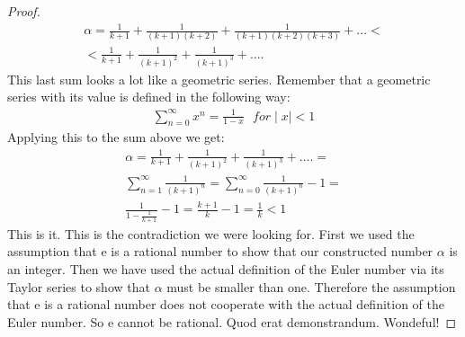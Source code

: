 \documentclass{article}
\theoremstyle{definition}
\begin{document}
\begin{proof}
\begin{align}
    \alpha = \frac{1}{k+1} + \frac{1}{(k+1)(k+2)} + \frac{1}{(k+1)(k+2)(k+3)}+... < \\
    < \frac{1}{k+1} + \frac{1}{(k+1)^2} + \frac{1}{(k+1)^3} + ....
\end{align}
This last sum looks a lot like a geometric series. Remember that a geometric series with its value is defined in the following way:
\begin{align}
    \sum _{n=0}^{\infty} x^n = \frac{1}{1-x} \: \: \: for \mid x \mid <1
\end{align}
Applying this to the sum above we get:
\begin{align}
    \alpha = \frac{1}{k+1} + \frac{1}{(k+1)^2} + \frac{1}{(k+1)^3} + .... = \\
    \sum_{n=1}^{\infty} \frac{1}{(k+1)^n} =  \sum_{n=0}^{\infty} \frac{1}{(k+1)^n} - 1 = \\
    \frac{1}{1-\frac{1}{k+1}} - 1 = \frac{k+1}{k} - 1 = \frac{1}{k} <1
\end{align}
This is it. This is the contradiction we were looking for. First we used the assumption that e is a rational number to show that our constructed number $\alpha$ is an integer. Then we have used the actual definition of the Euler number via its Taylor series to show that $\alpha$ must be smaller than one. Therefore the assumption that e is a rational number does not cooperate with the actual definition of the Euler number. So e cannot be rational. Quod erat demonstrandum. Wondeful!


\newpage


















\end{proof}
\end{document}
